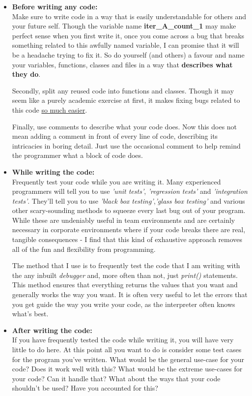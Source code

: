 \documentclass{article}
\begin{document}
\begin{itemize}
    \item \textbf{Before writing any code:} \\
    Make sure to write code in a way that is easily understandable for others and your future self. Though the variable name \textbf{iter\_A\_count\_1} may make perfect sense when you first write it, once you come across a bug that breaks something related to this awfully named variable, I can promise that it will be a headache trying to fix it. So do yourself (and others) a favour and name your variables, functions, classes and files in a way that \textbf{ describes what they do}.\medskip

    Secondly, split any reused code into functions and classes. Though it may seem like a purely academic exercise at first, it makes fixing bugs related to this code \underline{so much easier}.\medskip

    Finally, use comments to describe what your code does. Now this does not mean adding a comment in front of every line of code, describing its intricacies in boring detail. Just use the occasional comment to help remind the programmer what a block of code does.

    \item \textbf{While writing the code:} \\
    Frequently test your code while you are writing it. Many experienced programmers will tell you to use \textit{'unit tests'}, \textit{'regression tests'} and \textit{'integration tests'}. They'll tell you to use \textit{'black box testing'},\textit{'glass box testing'} and various other scary-sounding methods to squeeze every last bug out of your program. While these are undeniably useful in team environments and are certainly necessary in corporate environments where if your code breaks there are real, tangible consequences - I find that this kind of exhaustive approach removes all of the fun and flexibility from programming.\medskip

    The method that I use is to frequently test the code that I am writing with the any inbuilt \textit{debugger} and, more often than not, just \textit{print()} statements. This method ensures that everything returns the values that you want and generally works the way you want. It is often very useful to let the errors that you get guide the way you write your code, as the interpreter often knows what's best.

    \item \textbf{After writing the code:} \\
    If you have frequently tested the code while writing it, you will have very little to do here. At this point all you want to do is consider some test cases for the program you've written. What would be the general use-case for your code? Does it work well with this? What would be the extreme use-cases for your code? Can it handle that? What about the ways that your code shouldn't be used? Have you accounted for this? \medskip


\end{itemize}
\end{document}
